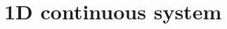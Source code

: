 \documentclass[a4paper,11pt]{article}
\numberwithin{equation}{section}
\begin{document}
\section{1D continuous system}
%
\end{document}
